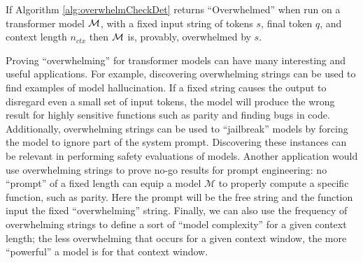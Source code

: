 \begin{theorem}
	\label{thm:informal_overwhelm}
	If Algorithm \ref{alg:overwhelmCheckDet} returns ``Overwhelmed'' when run on a transformer model $\mathcal{M}$, with a fixed input string of tokens $s$, final token $q$, and context length $n_{ctx}$ then $\mathcal{M}$ is, provably, overwhelmed by $s$.
\end{theorem}

Proving ``overwhelming'' for transformer models can have many interesting and useful applications.
For example, discovering overwhelming strings can be used to find examples of model hallucination.
If a fixed string causes the output to disregard even a small set of input tokens, the model will produce the wrong result for highly sensitive functions such as parity and finding bugs in code.
Additionally, overwhelming strings can be used to ``jailbreak'' models by forcing the model to ignore part of the system prompt.
Discovering these instances can be relevant in performing safety evaluations of models.
Another application would use overwhelming strings to prove no-go results for prompt engineering: no ``prompt'' of a fixed length can equip a model $\mathcal{M}$ to properly compute a specific function, such as parity. Here the prompt will be the free string and the function input the fixed ``overwhelming'' string. 
Finally, we can also use the frequency of overwhelming strings to define a sort of ``model complexity'' for a given context length; the less overwhelming that occurs for a given context window, the more ``powerful'' a model is for that context window.


